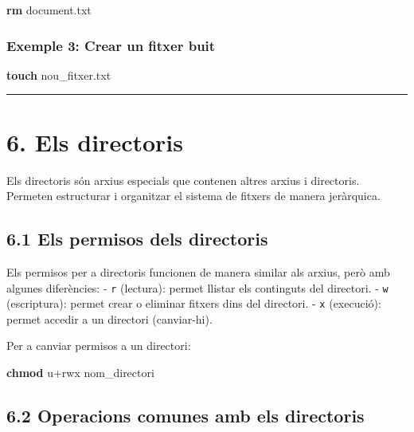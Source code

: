 \documentclass[
  12 pt,
  a4paper,
]{article}
\newenvironment{Shaded}{\begin{snugshade}}{\end{snugshade}}
\newcommand{\FunctionTok}[1]{\textcolor[rgb]{0.13,0.29,0.53}{\textbf{#1}}}
\newcommand{\NormalTok}[1]{#1}
\begin{document}
\begin{Shaded}
\begin{Highlighting}[]
\FunctionTok{rm}\NormalTok{ document.txt}
\end{Highlighting}
\end{Shaded}

\subsubsection{Exemple 3: Crear un fitxer
buit}\label{exemple-3-crear-un-fitxer-buit}

\begin{Shaded}
\begin{Highlighting}[]
\FunctionTok{touch}\NormalTok{ nou\_fitxer.txt}
\end{Highlighting}
\end{Shaded}

\begin{center}\rule{0.5\linewidth}{0.5pt}\end{center}

\section{6. Els directoris}\label{els-directoris}

Els directoris són arxius especials que contenen altres arxius i
directoris. Permeten estructurar i organitzar el sistema de fitxers de
manera jeràrquica.

\subsection{6.1 Els permisos dels
directoris}\label{els-permisos-dels-directoris}

Els permisos per a directoris funcionen de manera similar als arxius,
però amb algunes diferències: - \texttt{r} (lectura): permet llistar els
continguts del directori. - \texttt{w} (escriptura): permet crear o
eliminar fitxers dins del directori. - \texttt{x} (execució): permet
accedir a un directori (canviar-hi).

Per a canviar permisos a un directori:

\begin{Shaded}
\begin{Highlighting}[]
\FunctionTok{chmod}\NormalTok{ u+rwx nom\_directori}
\end{Highlighting}
\end{Shaded}

\subsection{6.2 Operacions comunes amb els
directoris}\label{operacions-comunes-amb-els-directoris}
\end{document}

